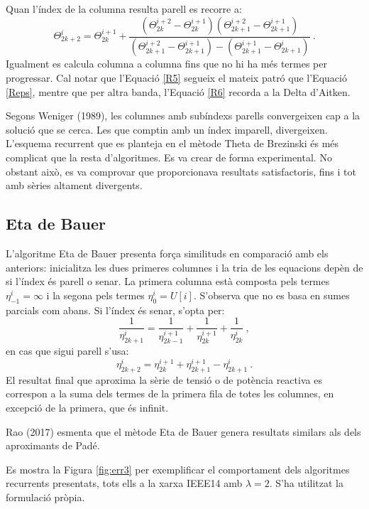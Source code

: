 Quan l'índex de la columna resulta parell es recorre a:
\begin{equation}
\Theta^i_{2k+2}=\Theta^{i+1}_{2k}+\frac{(\Theta^{i+2}_{2k}-\Theta^{i+1}_{2k})(\Theta^{i+2}_{2k+1}-\Theta^{i+1}_{2k+1})}{(\Theta^{i+2}_{2k+1}-\Theta^{i+1}_{2k+1})-(\Theta^{i+1}_{2k+1}-\Theta^{i}_{2k+1})}\ .
\label{R6}
\end{equation}
Igualment es calcula columna a columna fins que no hi ha més termes per progressar. Cal notar que l'Equació \ref{R5} segueix el mateix patró que l'Equació \ref{Reps}, mentre que per altra banda, l'Equació \ref{R6} recorda a la Delta d'Aitken. 

Segons Weniger (1989), les columnes amb subíndexs parells convergeixen cap a la solució que se cerca. Les que comptin amb un índex imparell, divergeixen. L'esquema recurrent que es planteja en el mètode Theta de Brezinski és més complicat que la resta d'algoritmes. Es va crear de forma experimental. No obstant això, es va comprovar que proporcionava resultats satisfactoris, fins i tot amb sèries altament divergents. 


\subsection{Eta de Bauer}
L'algoritme Eta de Bauer presenta força similituds en comparació amb els anteriors: inicialitza les dues primeres columnes i la tria de les equacions depèn de si l'índex és parell o senar. 
La primera columna està composta pels termes $\eta^i_{-1}=\infty$ i la segona pels termes $\eta^i_0=U[i]$. S'observa que no es basa en sumes parcials com abans. Si l'índex és senar, s'opta per:
\begin{equation}
\frac{1}{\eta^i_{2k+1}} = \frac{1}{\eta^{i+1}_{2k-1}}+\frac{1}{\eta^{i+1}_{2k}}+\frac{1}{\eta^{i}_{2k}}\ ,
\label{R7}
\end{equation}
en cas que sigui parell s'usa:
\begin{equation}
\eta^i_{2k+2} = \eta^{i+1}_{2k}+\eta^{i+1}_{2k+1}-\eta^i_{2k+1}\ .
\label{R8}
\end{equation}
El resultat final que aproxima la sèrie de tensió o de potència reactiva es correspon a la suma dels termes de la primera fila de totes les columnes, en excepció de la primera, que és infinit. 

Rao (2017) esmenta que el mètode Eta de Bauer genera resultats similars als dels aproximants de Padé.     

Es mostra la Figura \ref{fig:err3} per exemplificar el comportament dels algoritmes recurrents presentats, tots ells a la xarxa IEEE14 amb $\lambda=2$. S'ha utilitzat la formulació pròpia. 


